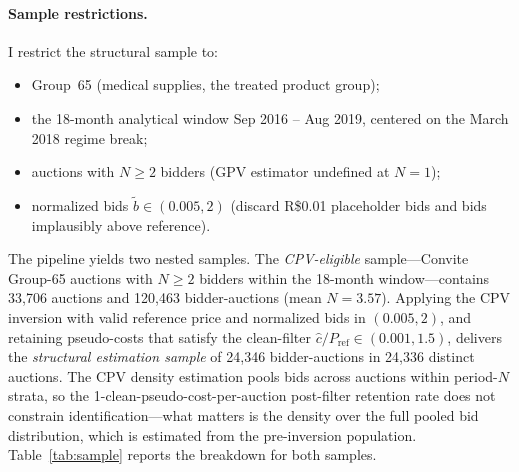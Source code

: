 \documentclass[12pt]{article}
\begin{document}
\paragraph{Sample restrictions.}
I restrict the structural sample to:
\begin{itemize}
  \item Group~65 (medical supplies, the treated product group);
  \item the 18-month analytical window Sep 2016 -- Aug 2019, centered on
        the March 2018 regime break;
  \item auctions with $N \ge 2$ bidders (GPV estimator undefined at $N=1$);
  \item normalized bids $\tilde b \in (0.005, 2)$ (discard R\$0.01
        placeholder bids and bids implausibly above reference).
\end{itemize}
The pipeline yields two nested samples. The \emph{CPV-eligible}
sample---Convite Group-65 auctions with $N \geq 2$ bidders within
the 18-month window---contains 33{,}706 auctions and 120{,}463
bidder-auctions (mean $N = 3.57$). Applying the CPV inversion
with valid reference price and normalized bids in $(0.005, 2)$,
and retaining pseudo-costs that satisfy the clean-filter
$\hat c / P_{\text{ref}} \in (0.001, 1.5)$, delivers the
\emph{structural estimation sample} of 24{,}346 bidder-auctions
in 24{,}336 distinct auctions. The CPV density estimation
pools bids across auctions within period-$N$ strata, so the
1-clean-pseudo-cost-per-auction post-filter retention rate does
not constrain identification---what matters is the density over
the full pooled bid distribution, which is estimated from the
pre-inversion population. Table~\ref{tab:sample} reports the
breakdown for both samples.
\end{document}
